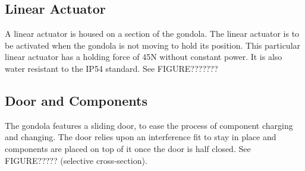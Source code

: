\documentclass[../main.tex]{subfiles}
\begin{document}
\subsection{Linear Actuator}
A linear actuator is housed on a section of the gondola. The linear actuator is to be activated when the gondola is not moving to hold its position. This particular linear actuator has a holding force of 45N without constant power. It is also water resistant to the IP54 standard. See FIGURE???????
\subsection{Door and Components}
The gondola features a sliding door, to ease the process of component charging and changing. The door relies upon an interference fit to stay in place and components are placed on top of it once the door is half closed. See FIGURE????? (selective cross-section).
\\
\end{document}
